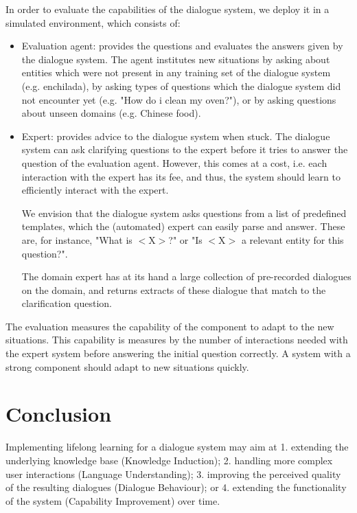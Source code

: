 \documentclass{lihlith}
\theoremstyle{definition}
\theoremstyle{remark}
\begin{document}
In order to evaluate the \LLL capabilities of the dialogue system, we deploy it in a simulated environment, which consists of: 
\begin{itemize}
    \item Evaluation agent: provides the questions and evaluates the answers given by the dialogue system. The agent institutes new situations by asking about entities which were not present in any training set of the dialogue system (e.g. enchilada), by asking types of questions which the dialogue system did not encounter yet (e.g. "How do i clean my oven?"), or by asking questions about unseen domains (e.g. Chinese food). 
    \item Expert: provides advice to the dialogue system when stuck. The dialogue system can ask clarifying questions to the expert before it tries to answer the question of the evaluation agent. However, this comes at a cost, i.e. each interaction with the expert has its fee, and thus, the system should learn to efficiently interact with the expert. 
    
    We envision that the dialogue system asks questions from a list of predefined templates, which the (automated) expert can easily parse and answer. These are, for instance, "What is $<$X$>$?" or "Is $<$X$>$ a relevant entity for this question?". 
    
    The domain expert has at its hand a large collection of pre-recorded dialogues on the domain, and returns extracts of these dialogue that match to the clarification question.  
\end{itemize}

The evaluation measures the capability of the \LLL component to adapt to the new situations. This capability is measures by the number of interactions needed with the expert system before answering the initial question correctly. A system with a strong \LLL component should adapt to new situations quickly. 




\section{Conclusion}
Implementing lifelong learning for a dialogue system may aim at 1. extending the underlying knowledge base (Knowledge Induction); 2. handling more complex user interactions (Language Understanding); 3. improving the perceived quality of the resulting dialogues (Dialogue Behaviour); or 4. extending the functionality of the system (Capability Improvement) over time. 
\end{document}

